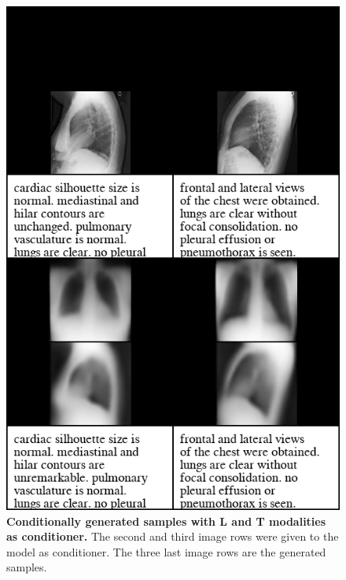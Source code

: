 \documentclass{midl} %
\begin{document}
    \begin{figure}[h]
    \centering
  \hfill
  \begin{minipage}[t]{.45\textwidth}
    \begin{center}  
      \includegraphics[scale=0.25]{data/cond_gen/Lateral_text_small}
      \caption{\small{\textbf{Conditionally generated samples with L and T modalities as conditioner.} The second and third image rows were given to the model as conditioner. The three last image rows are the generated samples.}}
      \label{fig:fig_cond_lattext}
    \end{center}
  \end{minipage}
  \hfill
  \begin{minipage}[t]{.45\textwidth}
    \begin{center}  

\end{center}
\end{minipage}
\end{figure}
\end{document}
